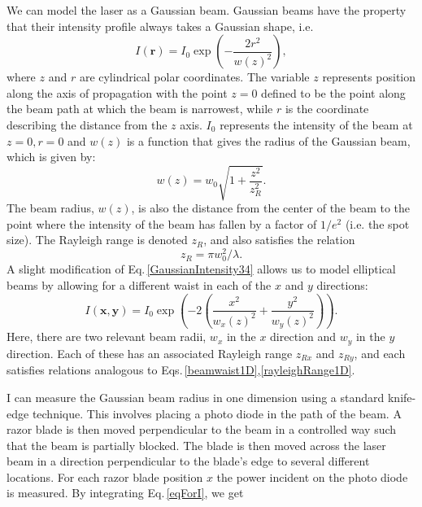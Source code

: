 We can model the laser as a Gaussian beam. Gaussian beams have the property that their intensity profile always takes a Gaussian shape, i.e. \cite{lasersMilonniEberly}
\begin{equation}
\label{GaussianIntensity34}
    I(\mathbf{r})=I_0\exp\left(-\frac{2r^2}{w(z)^2}\right),
\end{equation}
where $z$ and $r$ are cylindrical polar coordinates. The variable $z$ represents position along the axis of propagation with the point $z=0$ defined to be the point along the beam path at which the beam is narrowest, while $r$ is the coordinate describing the distance from the $z$ axis. $I_0$ represents the intensity of the beam at $z=0, r=0$ and $w(z)$ is a function that gives the radius of the Gaussian beam, which is given by:
\begin{equation}
w(z)=w_0\sqrt{1+\frac{z^2}{z_R^2}}\label{beamwaist1D}.
\end{equation}
The beam radius, $w(z)$, is also the distance from the center of the beam to the point where the intensity of the beam has fallen by a factor of $1/e^2$ (i.e. the spot size). The Rayleigh range is denoted $z_R$, and also satisfies the relation 
\begin{equation}
z_R=\pi w_0^2/\lambda \label{rayleighRange1D}.
\end{equation}
A slight modification of Eq.\,\eqref{GaussianIntensity34} allows us to model elliptical beams by allowing for a different waist in each of the $x$ and $y$ directions:
\begin{equation}\label{eqForI}
    I(\mathbf{x,y})=I_0\exp\left(-2\left(\frac{x^2}{w_x(z)^2}+\frac{y^2}{w_y(z)^2}\right)\right).
\end{equation}
Here, there are two relevant beam radii, $w_x$ in the $x$ direction and $w_y$ in the $y$ direction. Each of these has an associated Rayleigh range $z_{Rx}$ and $z_{Ry}$, and each satisfies relations analogous to Eqs.\,\eqref{beamwaist1D},\eqref{rayleighRange1D}.

I can measure the Gaussian beam radius in one dimension using a standard knife-edge technique. This involves placing a photo diode in the path of the beam. A razor blade is then moved perpendicular to the beam in a controlled way such that the beam is partially blocked. The blade is then moved across the laser beam in a direction perpendicular to the blade's edge to several different locations. For each razor blade position $x$ the power incident on the photo diode is measured. By integrating Eq.\,\ref{eqForI}, we get

